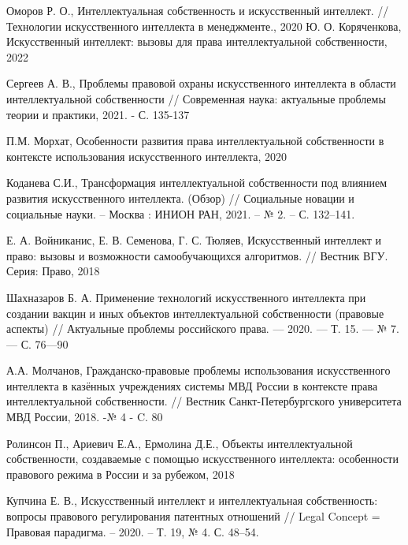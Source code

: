 \begin{thebibliography}{}
Оморов Р. О., Интеллектуальная собственность и искусственный интеллект. // Технологии искусственного
интеллекта в менеджменте., 2020
Ю. О. Коряченкова, Искусственный интеллект: вызовы для права интеллектуальной
собственности, 2022

Сергеев А. В., Проблемы правовой охраны искусственного интеллекта в области
интеллектуальной собственности // Современная наука: актуальные проблемы
теории и практики, 2021. - С. 135-137

П.М. Морхат, Особенности развития права интеллектуальной собственности в
контексте использования искусственного интеллекта, 2020

Коданева С.И., Трансформация интеллектуальной собственности под влиянием развития искусственного интеллекта.
(Обзор) // Социальные новации и социальные науки. – Москва : ИНИОН РАН, 2021. – № 2. – С. 132–141.

Е. А. Войниканис, Е. В. Семенова, Г. С. Тюляев, Искусственный интеллект и право: вызовы и возможности
самообучающихся алгоритмов. // Вестник ВГУ. Серия: Право, 2018

Шахназаров Б. А. Применение технологий искусственного интеллекта при создании вакцин и иных объектов интеллектуальной
собственности (правовые аспекты) // Актуальные проблемы российского права. — 2020. — Т. 15. — № 7. — С. 76—90

А.А. Молчанов, Гражданско-правовые проблемы использования искусственного интеллекта в казённых учреждениях
системы МВД России в контексте права интеллектуальной собственности. // Вестник Санкт-Петербургского университета
МВД России, 2018. -№ 4 - C. 80

Ролинсон П., Ариевич Е.А., Ермолина Д.Е., Объекты интеллектуальной собственности, создаваемые с помощью
искусственного интеллекта: особенности правового режима в России и за рубежом, 2018

Купчина Е. В., Искусственный интеллект и интеллектуальная собственность: вопросы правового регулирования патентных отношений
// Legal Concept = Правовая парадигма. – 2020. – Т. 19, № 4. С. 48–54.

\end{thebibliography}




